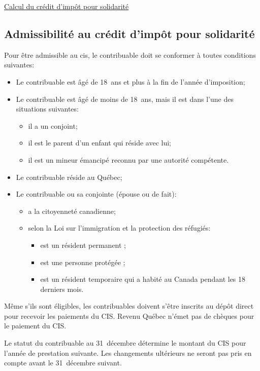 \qct\href{https://www.revenuquebec.ca/fr/citoyens/credits-dimpot/credit-dimpot-pour-solidarite/calcul-du-credit-dimpot-pour-solidarite/}{Calcul du crédit d'impôt pour solidarité}


\subsection{Admissibilité au crédit d'impôt pour solidarité}
Pour être admissible au \acrfull{cis}, le contribuable doit se conformer à toutes conditions suivantes:
\begin{itemize}
	\item Le contribuable est âgé de 18~ans et plus à la fin de l'année d'imposition;
	\item Le contribuable est âgé de moins de 18~ans, mais il est dans l'une des situations suivantes:
	\begin{itemize}
		\item il a un conjoint;
		\item il est le parent d'un enfant qui réside avec lui;
		\item il est un mineur émancipé reconnu par une autorité compétente.
	\end{itemize}
	\item Le contribuable réside au Québec;
	\item Le contribuable ou sa conjointe (épouse ou de fait):
	\begin{itemize}
		\item a la citoyenneté canadienne;
		\item selon la Loi sur l'immigration et la protection des réfugiés:
		\begin{itemize}
			\item est un \og résident permanent \fg{};
			\item est une \og personne protégée \fg{};
			\item est un \og résident temporaire \fg{} qui a habité au Canada pendant les 18 derniers mois.
		\end{itemize}
	\end{itemize}
\end{itemize}

\begin{note}
	Même s'ils sont éligibles, les contribuables doivent s'être inscrits au dépôt direct pour recevoir les paiements du CIS. Revenu Québec n'émet pas de chèques pour le paiement du CIS.
\end{note}

\begin{note}
	Le statut du contribuable au 31~décembre détermine le montant du CIS pour l'année de prestation suivante. Les changements ultérieurs ne seront pas pris en compte avant le 31~décembre suivant.
\end{note}


